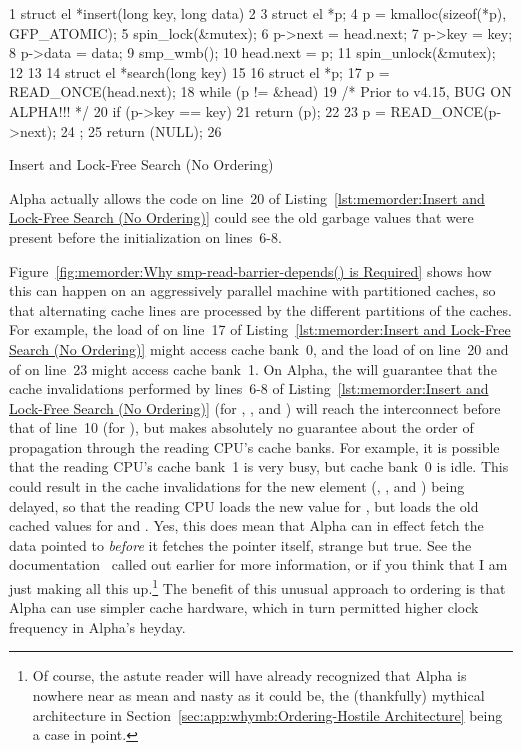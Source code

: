 \begin{listing}[tbp]
{ \scriptsize
\begin{verbbox}
  1 struct el *insert(long key, long data)
  2 {
  3     struct el *p;
  4     p = kmalloc(sizeof(*p), GFP_ATOMIC);
  5     spin_lock(&mutex);
  6     p->next = head.next;
  7     p->key = key;
  8     p->data = data;
  9     smp_wmb();
 10     head.next = p;
 11     spin_unlock(&mutex);
 12 }
 13
 14 struct el *search(long key)
 15 {
 16     struct el *p;
 17     p = READ_ONCE(head.next);
 18     while (p != &head) {
 19         /* Prior to v4.15, BUG ON ALPHA!!! */
 20         if (p->key == key) {
 21             return (p);
 22         }
 23         p = READ_ONCE(p->next);
 24     };
 25     return (NULL);
 26 }
\end{verbbox}
}
\centering
\theverbbox
\caption{Insert and Lock-Free Search (No Ordering)}
\label{lst:memorder:Insert and Lock-Free Search (No Ordering)}
\end{listing}

Alpha actually allows the code on line~20 of
Listing~\ref{lst:memorder:Insert and Lock-Free Search (No Ordering)}
could see the old
garbage values that were present before the initialization on lines~6-8.

Figure~\ref{fig:memorder:Why smp-read-barrier-depends() is Required}
shows how this can happen on
an aggressively parallel machine with partitioned caches, so that
alternating cache lines are processed by the different partitions
of the caches.
For example, the load of  on line~17 of
Listing~\ref{lst:memorder:Insert and Lock-Free Search (No Ordering)}
might access cache bank~0,
and the load of  on line~20 and of  on line~23
might access cache bank~1.
On Alpha, the  will guarantee that the cache invalidations
performed by lines~6-8 of
Listing~\ref{lst:memorder:Insert and Lock-Free Search (No Ordering)}
(for , , and ) will reach
the interconnect before that of line~10 (for ), but
makes absolutely no guarantee about the order of
propagation through the reading CPU's cache banks.
For example, it is possible that the reading CPU's cache bank~1 is very
busy, but cache bank~0 is idle.
This could result in the cache invalidations for the new element
(, , and ) being
delayed, so that the reading CPU loads the new value for ,
but loads the old cached values for  and .
Yes, this does mean that Alpha can in effect fetch
the data pointed to {\em before} it fetches the pointer itself, strange
but true.
See the documentation~\cite{Compaq01,WilliamPugh2000Gharachorloo}
called out earlier for more information,
or if you think that I am just making all this up.\footnote{
	Of course, the astute reader will have already recognized that
	Alpha is nowhere near as mean and nasty as it could be,
	the (thankfully) mythical architecture in
	Section~\ref{sec:app:whymb:Ordering-Hostile Architecture}
	being a case in point.}
The benefit of this unusual approach to ordering is that Alpha can use
simpler cache hardware, which in turn permitted higher clock frequency
in Alpha's heyday.

